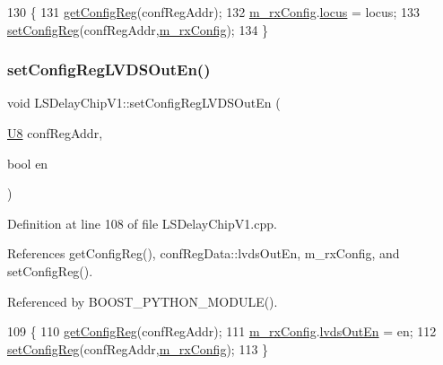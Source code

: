 \begin{DoxyCode}
130 \{
131     \hyperlink{classLSDelayChipV1_a4f338071d49df7eae55020a5f5fa8474}{getConfigReg}(confRegAddr);
132     \hyperlink{classLSDelayChipV1_a4818ac5c0d7ccf2845a01226234bdb67}{m\_rxConfig}.\hyperlink{structconfRegData_a0ed9976dd55237ee70ba3621b0f4f58c}{locus} = locus;
133     \hyperlink{classLSDelayChipV1_a11fa2ebfa37c5cf0544ddb68c7d43e94}{setConfigReg}(confRegAddr,\hyperlink{classLSDelayChipV1_a4818ac5c0d7ccf2845a01226234bdb67}{m\_rxConfig});
134 \}
\end{DoxyCode}
\mbox{\label{classLSDelayChipV1_a46a7aee8c7373c6858af9ecd29e9b116}} 
\subsubsection{\texorpdfstring{set\+Config\+Reg\+L\+V\+D\+S\+Out\+En()}{setConfigRegLVDSOutEn()}}
{\footnotesize\ttfamily void L\+S\+Delay\+Chip\+V1\+::set\+Config\+Reg\+L\+V\+D\+S\+Out\+En (\begin{DoxyParamCaption}\item[{\hyperlink{ICECALv3_8h_a3cb25ca6f51f003950f9625ff05536fc}{U8}}]{conf\+Reg\+Addr,  }\item[{bool}]{en }\end{DoxyParamCaption})}



Definition at line 108 of file L\+S\+Delay\+Chip\+V1.\+cpp.



References get\+Config\+Reg(), conf\+Reg\+Data\+::lvds\+Out\+En, m\+\_\+rx\+Config, and set\+Config\+Reg().



Referenced by B\+O\+O\+S\+T\+\_\+\+P\+Y\+T\+H\+O\+N\+\_\+\+M\+O\+D\+U\+L\+E().


\begin{DoxyCode}
109 \{
110     \hyperlink{classLSDelayChipV1_a4f338071d49df7eae55020a5f5fa8474}{getConfigReg}(confRegAddr);
111     \hyperlink{classLSDelayChipV1_a4818ac5c0d7ccf2845a01226234bdb67}{m\_rxConfig}.\hyperlink{structconfRegData_a709d8d691ef0c8ea5c4c03aac3d851f1}{lvdsOutEn} = en;
112     \hyperlink{classLSDelayChipV1_a11fa2ebfa37c5cf0544ddb68c7d43e94}{setConfigReg}(confRegAddr,\hyperlink{classLSDelayChipV1_a4818ac5c0d7ccf2845a01226234bdb67}{m\_rxConfig});
113 \}
\end{DoxyCode}
\mbox{\label{classLSDelayChipV1_ad83fb046d3576cdccdb4b4fe59f7ff71}} 
